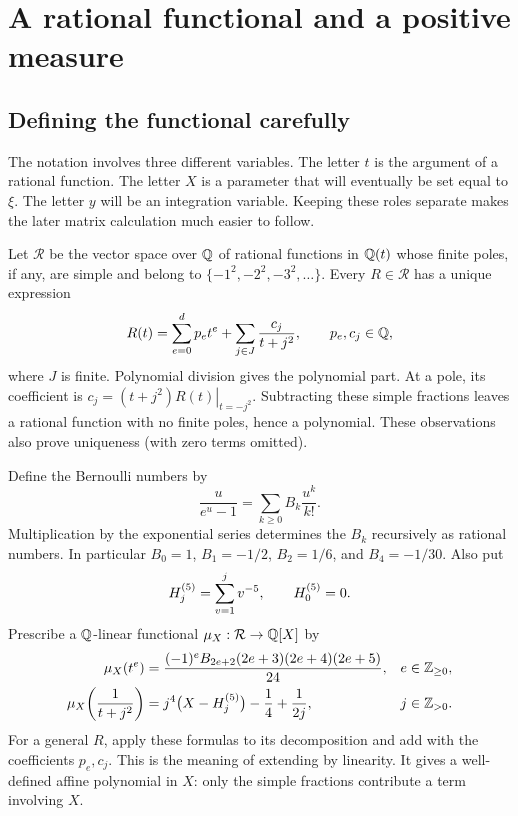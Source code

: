 \section{A rational functional and a positive measure}\label{sec:functional}
\subsection{Defining the functional carefully}
The notation involves three different variables. The letter $t$ is the
argument of a rational function. The letter $X$ is a parameter that will
eventually be set equal to $\xi$. The letter $y$ will be an integration
variable. Keeping these roles separate makes the later matrix calculation
much easier to follow.

Let $\mathcal R$ be the vector space over $\mathbb Q$ of rational functions in
$\mathbb Q(t)$ whose finite poles, if any, are simple and belong to
$\{-1^2,-2^2,-3^2,\ldots\}$. Every $R\in\mathcal R$ has a unique expression
\begin{equation}\label{eq:partial}
 R(t)=\sum_{e=0}^{d}p_et^e+\sum_{j\in J}\frac{c_j}{t+j^2},
 \qquad p_e,c_j\in\mathbb Q,
\end{equation}
where $J$ is finite. Polynomial division gives the polynomial part.
At a pole, its coefficient is
$c_j=\left.(t+j^2)R(t)\right|_{t=-j^2}$.
Subtracting these simple fractions leaves a rational function with no finite
poles, hence a polynomial. These observations also prove uniqueness
(with zero terms omitted).

Define the Bernoulli numbers by
\[
 \frac{u}{e^u-1}=\sum_{k\geq0}B_k\frac{u^k}{k!}.
\]
Multiplication by the exponential series determines the $B_k$ recursively
as rational numbers. In particular $B_0=1$, $B_1=-1/2$, $B_2=1/6$,
and $B_4=-1/30$. Also put
\[
 H_{j}^{(5)}=\sum_{v=1}^j v^{-5},\qquad H_{0}^{(5)}=0.
\]
Prescribe a $\mathbb Q$-linear functional $\mu_X:\mathcal R\to\mathbb Q[X]$ by
\begin{align}
 \mu_X(t^e)&=
 \frac{(-1)^eB_{2e+2}(2e+3)(2e+4)(2e+5)}{24},
 &&e\in\mathbb Z_{\geq0},\label{eq:mu-moment}\\
 \mu_X\!\left(\frac1{t+j^2}\right)&=
 j^4\bigl(X-H_{j}^{(5)}\bigr)-\frac14+\frac1{2j},
 &&j\in\mathbb Z_{>0}.\label{eq:mu-pole}
\end{align}
For a general $R$, apply these formulas to its decomposition and add with
the coefficients $p_e,c_j$. This is the meaning of extending by linearity.
It gives a well-defined affine polynomial in $X$: only the simple
fractions contribute a term involving $X$.

